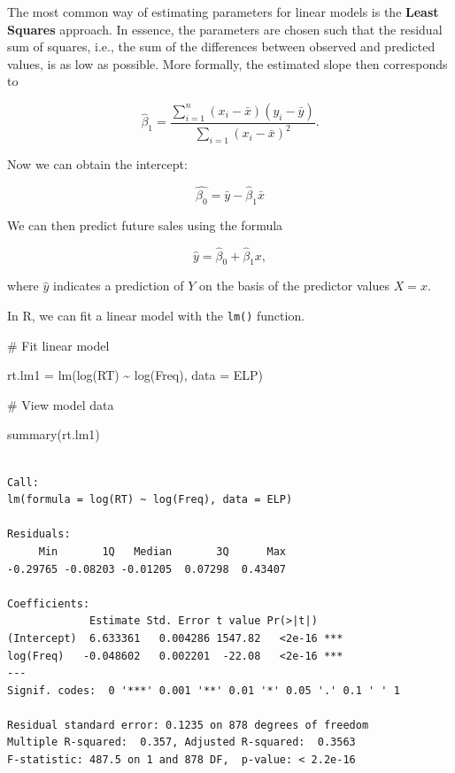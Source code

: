 \documentclass[
  11pt,
  letterpaper,
  DIV=11,
  numbers=noendperiod]{scrreprt}
\newenvironment{Shaded}{\begin{snugshade}}{\end{snugshade}}
\newcommand{\AttributeTok}[1]{\textcolor[rgb]{0.40,0.45,0.13}{#1}}
\newcommand{\CommentTok}[1]{\textcolor[rgb]{0.37,0.37,0.37}{#1}}
\newcommand{\FunctionTok}[1]{\textcolor[rgb]{0.28,0.35,0.67}{#1}}
\newcommand{\NormalTok}[1]{\textcolor[rgb]{0.00,0.23,0.31}{#1}}
\newcommand{\OtherTok}[1]{\textcolor[rgb]{0.00,0.23,0.31}{#1}}
\newcommand{\SpecialCharTok}[1]{\textcolor[rgb]{0.37,0.37,0.37}{#1}}
\begin{document}
\begin{tcolorbox}[enhanced jigsaw, toprule=.15mm, opacitybacktitle=0.6, coltitle=black, arc=.35mm, colback=white, title=\textcolor{quarto-callout-tip-color}{\faLightbulb}\hspace{0.5em}{How are the coefficients estimated?}, titlerule=0mm, toptitle=1mm, bottomtitle=1mm, breakable, rightrule=.15mm, opacityback=0, bottomrule=.15mm, leftrule=.75mm, colframe=quarto-callout-tip-color-frame, left=2mm, colbacktitle=quarto-callout-tip-color!10!white]

The most common way of estimating parameters for linear models is the
\textbf{Least Squares} approach. In essence, the parameters are chosen
such that the residual sum of squares, i.e., the sum of the differences
between observed and predicted values, is as low as possible. More
formally, the estimated slope then corresponds to

\[ \hat{\beta}_1 = \frac{\sum_{i=1}^n(x_i - \bar{x})(y_i- \bar{y})}{\sum_{i=1}(x_i- \bar{x})^2}.\]

Now we can obtain the intercept:

\[
\hat{\beta_0}= \bar{y}- \hat{\beta}_1\bar{x}
\]

\end{tcolorbox}

We can then predict future sales using the formula

\[
\hat{y} = \hat{\beta}_0 + \hat{\beta}_1x,
\]

where \(\hat{y}\) indicates a prediction of \(Y\) on the basis of the
predictor values \(X = x\).

In R, we can fit a linear model with the \texttt{lm()} function.

\begin{Shaded}
\begin{Highlighting}[]
\CommentTok{\# Fit linear model}

\NormalTok{rt.lm1 }\OtherTok{=} \FunctionTok{lm}\NormalTok{(}\FunctionTok{log}\NormalTok{(RT) }\SpecialCharTok{\textasciitilde{}} \FunctionTok{log}\NormalTok{(Freq), }\AttributeTok{data =}\NormalTok{ ELP)}

\CommentTok{\# View model data}

\FunctionTok{summary}\NormalTok{(rt.lm1)}
\end{Highlighting}
\end{Shaded}

\begin{verbatim}

Call:
lm(formula = log(RT) ~ log(Freq), data = ELP)

Residuals:
     Min       1Q   Median       3Q      Max 
-0.29765 -0.08203 -0.01205  0.07298  0.43407 

Coefficients:
             Estimate Std. Error t value Pr(>|t|)    
(Intercept)  6.633361   0.004286 1547.82   <2e-16 ***
log(Freq)   -0.048602   0.002201  -22.08   <2e-16 ***
---
Signif. codes:  0 '***' 0.001 '**' 0.01 '*' 0.05 '.' 0.1 ' ' 1

Residual standard error: 0.1235 on 878 degrees of freedom
Multiple R-squared:  0.357, Adjusted R-squared:  0.3563 
F-statistic: 487.5 on 1 and 878 DF,  p-value: < 2.2e-16
\end{verbatim}
\end{document}
